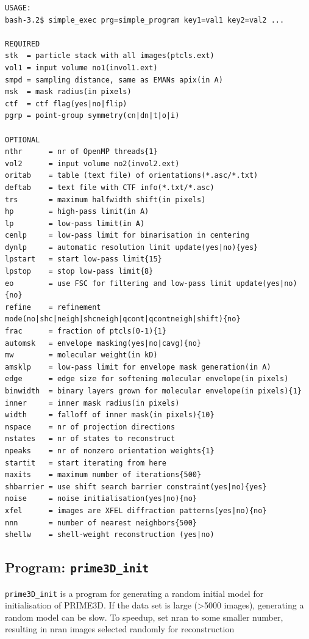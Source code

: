 \documentclass[a4paper,11pt]{article}
\newcommand{\prgname}[1]{\textcolor{NavyBlue}{\texttt{#1}}}
\begin{document}
\begin{verbatim}
USAGE:
bash-3.2$ simple_exec prg=simple_program key1=val1 key2=val2 ...

REQUIRED
stk  = particle stack with all images(ptcls.ext)
vol1 = input volume no1(invol1.ext)
smpd = sampling distance, same as EMANs apix(in A)
msk  = mask radius(in pixels)
ctf  = ctf flag(yes|no|flip)
pgrp = point-group symmetry(cn|dn|t|o|i)

OPTIONAL
nthr      = nr of OpenMP threads{1}
vol2      = input volume no2(invol2.ext)
oritab    = table (text file) of orientations(*.asc/*.txt)
deftab    = text file with CTF info(*.txt/*.asc)
trs       = maximum halfwidth shift(in pixels)
hp        = high-pass limit(in A)
lp        = low-pass limit(in A)
cenlp     = low-pass limit for binarisation in centering
dynlp     = automatic resolution limit update(yes|no){yes}
lpstart   = start low-pass limit{15}
lpstop    = stop low-pass limit{8}
eo        = use FSC for filtering and low-pass limit update(yes|no){no}
refine    = refinement mode(no|shc|neigh|shcneigh|qcont|qcontneigh|shift){no}
frac      = fraction of ptcls(0-1){1}
automsk   = envelope masking(yes|no|cavg){no}
mw        = molecular weight(in kD)
amsklp    = low-pass limit for envelope mask generation(in A)
edge      = edge size for softening molecular envelope(in pixels)
binwidth  = binary layers grown for molecular envelope(in pixels){1}
inner     = inner mask radius(in pixels)
width     = falloff of inner mask(in pixels){10}
nspace    = nr of projection directions
nstates   = nr of states to reconstruct
npeaks    = nr of nonzero orientation weights{1}
startit   = start iterating from here
maxits    = maximum number of iterations{500}
shbarrier = use shift search barrier constraint(yes|no){yes}
noise     = noise initialisation(yes|no){no}
xfel      = images are XFEL diffraction patterns(yes|no){no}
nnn       = number of nearest neighbors{500}
shellw    = shell-weight reconstruction (yes|no)
\end{verbatim}

\subsection{Program: \prgname{prime3D\_init}}
\label{prime3D_init}
\prgname{prime3D\_init} is a program for generating a random initial model for initialisation of PRIME3D. If the data set is large (>5000 images), generating a random model can be slow. To speedup, set nran to some smaller number, resulting in nran images selected randomly for reconstruction
\end{document}
